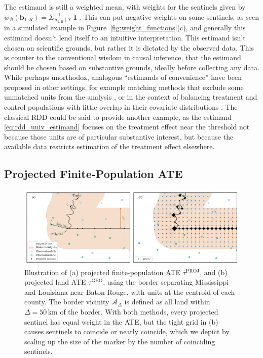 \documentclass[letter,12pt]{article}
\DeclareMathOperator{\ones}{\mathbf{1}}
\newcommand{\area}{\mathcal{A}}
\newcommand{\border}{\mathcal{B}}
\newcommand{\sentinel}{\bm{b}}
\newcommand{\numsent}{R}
\newcommand{\sentinels}{\sentinel_{1:\numsent}}
\newcommand{\tauproj}{\tau^{\mathrm{PROJ}}}
\newcommand{\taugeo}{\tau^{\mathrm{GEO}}}
\newcommand{\buffer}{\Delta}
\newcommand{\weightb}{w_{\border}}
\begin{document}
The estimand is still a weighted mean, with weights for the sentinels given by \(\weightb(\sentinels) = \Sigma_{\sentinels \mid Y}^{-1} \ones\).
This can put negative weights on some sentinels, as seen in a simulated example in Figure~\ref{fig:weight_functions}(c), and generally this estimand doesn't lend itself to an intuitive interpretation.
This estimand isn't chosen on scientific grounds, but rather it is dictated by the observed data.
This is counter to the conventional wisdom in causal inference, that the estimand should be chosen based on substantive grounds, ideally before collecting any data.
While perhaps unorthodox, analogous ``estimands of convenience'' have been proposed in other settings, for example matching methods that exclude some unmatched units from the analysis \citep[discussed in][]{crump2009dealing}, or in the context of balancing treatment and control populations with little overlap in their covariate distributions \citep{li2016balancing}.
The classical RDD could be said to provide another example, as the estimand \eqref{eq:rdd_univ_estimand} focuses on the treatment effect near the threshold not because those units are of particular substantive interest, but because the available data restricts estimation of the treatment effect elsewhere.



\hypertarget{projected-finite-population-ate}{%
\subsection{Projected Finite-Population ATE}\label{projected-finite-population-ate}}



\begin{figure}[tbp]
    \centering
    \includegraphics[width=\textwidth]{../figures/mississippi_projection_methods.png}
    \caption{\label{fig:mississippi_projection_methods}
        Illustration of (a) projected finite-population ATE \(\tauproj\), and (b) projected land ATE \(\taugeo\), using the border separating Mississippi and Louisiana near Baton Rouge, with units at the centroid of each county.
        The border vicinity \(\area_\buffer\) is defined as all land within \(\buffer=50\,\mathrm{km}\) of the border.
    With both methods, every projected sentinel has equal weight in the ATE, but the tight grid in (b) causes sentinels to coincide or nearly coincide, which we depict by scaling up the size of the marker by the number of coinciding sentinels.}
\end{figure}
\end{document}
